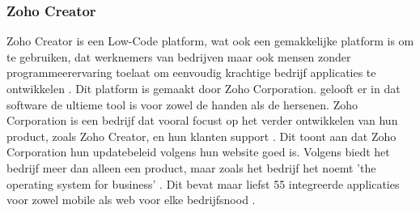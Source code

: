 \subsubsection*{Zoho Creator}
Zoho Creator is een Low-Code platform, wat ook een gemakkelijke platform is om te gebruiken, dat werknemers van bedrijven maar ook mensen zonder programmeerervaring toelaat
om eenvoudig krachtige bedrijf applicaties te ontwikkelen \autocite{Computer2022}. Dit platform is gemaakt door Zoho Corporation. \textcite{ZohoCorporation2024a} gelooft er in dat software de ultieme tool is voor zowel de handen als de hersenen.
Zoho Corporation is een bedrijf dat vooral focust op het verder ontwikkelen van hun product, zoals Zoho Creator, en hun klanten support \autocite{ZohoCorporation2024a}. Dit toont aan dat Zoho Corporation
hun updatebeleid volgens hun website goed is. Volgens \textcite{ZohoCorporation2024a} biedt het bedrijf meer dan alleen een product, maar zoals het bedrijf het noemt 'the operating system for business' \autocite{ZohoCorporation2024a}.
Dit bevat maar liefst 55 integreerde applicaties voor zowel mobile als web voor elke bedrijfsnood \autocite{ZohoCorporation2024a}.

